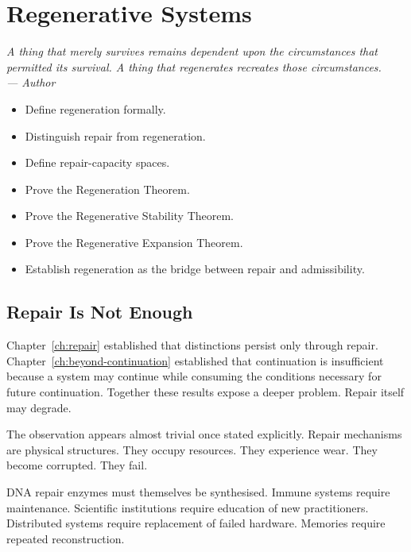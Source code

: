 \documentclass[12pt,twoside,openright]{book}
\newenvironment{epigraph}[2]{%
  \vspace{1em}\begin{flushright}
  \begin{minipage}{0.72\textwidth}
  \itshape\small #1\\[0.4em]
  \upshape\footnotesize\sffamily\color{DistGray}--- #2
  \end{minipage}\end{flushright}\vspace{1.5em}}{}
\newenvironment{objectives}{%
  \begin{tcolorbox}[colback=DistBlue!5,colframe=DistBlue,
    title={\faCheckCircle\enspace Learning Objectives},
    fonttitle=\sffamily\bfseries\color{white},
    attach boxed title to top left={yshift=-2mm,xshift=4mm},
    boxed title style={colback=DistBlue},breakable]
  \begin{itemize}[leftmargin=*,nosep]}{%
  \end{itemize}\end{tcolorbox}\vspace{1em}}
\begin{document}
\chapter{Regenerative Systems}
\label{ch:regeneration}

\begin{epigraph}{A thing that merely survives remains
  dependent upon the circumstances that permitted its
  survival. A thing that regenerates recreates those
  circumstances.}%
  {Author}
\end{epigraph}

\begin{objectives}
  \item Define regeneration formally.
  \item Distinguish repair from regeneration.
  \item Define repair-capacity spaces.
  \item Prove the Regeneration Theorem.
  \item Prove the Regenerative Stability Theorem.
  \item Prove the Regenerative Expansion Theorem.
  \item Establish regeneration as the bridge between repair
        and admissibility.
\end{objectives}

\section{Repair Is Not Enough}
\label{sec:ch11-not-enough}

Chapter~\ref{ch:repair} established that distinctions
persist only through repair. Chapter~\ref{ch:beyond-continuation}
established that continuation is insufficient because a
system may continue while consuming the conditions
necessary for future continuation. Together these results
expose a deeper problem. Repair itself may degrade.

The observation appears almost trivial once stated
explicitly. Repair mechanisms are physical structures. They
occupy resources. They experience wear. They become
corrupted. They fail.

DNA repair enzymes must themselves be synthesised. Immune
systems require maintenance. Scientific institutions
require education of new practitioners. Distributed systems
require replacement of failed hardware. Memories require
repeated reconstruction.
\end{document}
